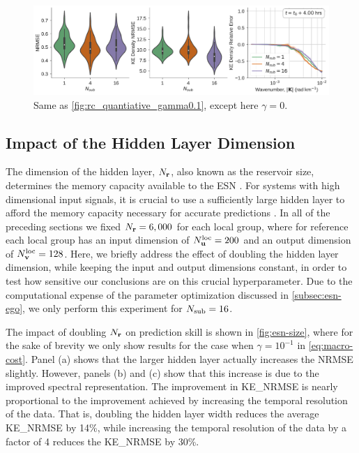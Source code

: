 \begin{figure}
    \centering
    \includegraphics[width=\textwidth]{../figures/rc_all_gamma0.0.pdf}
    \caption{Same as \cref{fig:rc_quantiative_gamma0.1}, except here $\gamma=0$.}
    \label{fig:rc_quantiative_gamma0.0}
\end{figure}

\subsection{Impact of the Hidden Layer Dimension}
\label{subsec:esn-size}

The dimension of the hidden layer, $N_{\mathbf{r}}$, also known as the reservoir size, determines the
memory capacity available to the ESN
\citep{jaeger_echo_2001,lukosevicius_practical_2012}.
For systems with high dimensional input signals, it is crucial to use a sufficiently large hidden layer to afford the memory capacity necessary for accurate
predictions \citep{hermans_memory_2010}.
In all of the preceding sections we fixed $N_{\mathbf{r}}=6,000$ for each local group,
where for reference each local group has an input dimension of
$N_{\mathbf{u}}^\text{loc}=200$ and an output dimension of $N_{\mathbf{v}}^\text{loc}=128$.
Here, we briefly address the effect of doubling the hidden layer dimension, while keeping the input and output dimensions constant, in order to test how
sensitive our conclusions are on this crucial hyperparameter.
Due to the computational expense of the parameter optimization discussed in
\cref{subsec:esn-ego}, we only perform this experiment for $N_\text{sub}=16$.

The impact of doubling $N_{\mathbf{r}}$ on prediction skill is shown in
\cref{fig:esn-size}, where for the sake of brevity we only show results for the
case when $\gamma=10^{-1}$ in \cref{eq:macro-cost}.
Panel (a) shows that the larger hidden layer actually increases the NRMSE slightly.
However, panels (b) and (c) show that this increase is due to the improved
spectral representation.
The improvement in KE\_NRMSE is nearly proportional to the improvement achieved by increasing
the temporal resolution of the data.
That is, doubling the hidden layer width reduces the average KE\_NRMSE by 14\%,
while increasing the temporal resolution of the data by a factor of 4 reduces
the KE\_NRMSE by 30\%.

